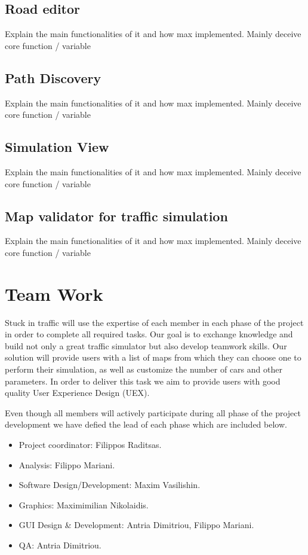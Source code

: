 \documentclass[oneside]{article}
\begin{document}
\subsection{Road editor} Explain the main functionalities of it and how max implemented. Mainly deceive core function / variable 

\subsection{Path Discovery} Explain the main functionalities of it and how max implemented. Mainly deceive core function / variable 

\subsection{Simulation View} Explain the main functionalities of it and how max implemented. Mainly deceive core function / variable 

\subsection{Map validator for traffic simulation} Explain the main functionalities of it and how max implemented. Mainly deceive core function / variable 
\newpage


\section{Team Work}

Stuck in traffic will use the expertise of each member in each phase of the project in order to complete all required tasks. Our goal is to exchange knowledge and build not only a great traffic simulator but also develop teamwork skills. 
Our solution will provide users with a list of maps from which they can choose one to perform their simulation, as well as customize the number of cars and other parameters. In order to deliver this task we aim to provide users with good quality User Experience Design (UEX).

\noindent Even though all members will actively participate during all phase of the project development we have defied the lead of each phase which are included below.  

\begin{itemize} 

\item Project coordinator: Filippos Raditsas.
\item Analysis: Filippo Mariani.
\item Software Design/Development: Maxim Vasilishin.
\item Graphics: Maximimilian Nikolaidis.
\item GUI Design \& Development: Antria Dimitriou, Filippo Mariani.
\item QA: Antria Dimitriou.

\end{itemize}
\end{document}
